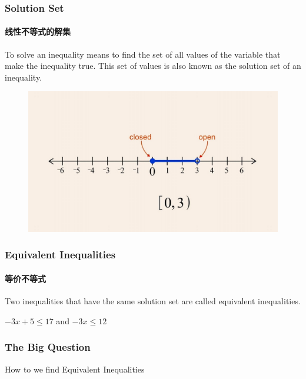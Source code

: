 \documentclass[
	11pt, %
	handout,
]{beamer}
\begin{document}

\begin{frame}
	\frametitle{Solution Set}
	\framesubtitle{线性不等式的解集}
	\begin{definition}
			To solve an inequality means to find the set of all values of the variable that make the inequality true. This set of values is also known as the \alert{solution set} of an inequality.
	\end{definition}
	
	\smallskip %
		
	\begin{figure}
		\includegraphics[width=0.8\linewidth]{Solution_Set.jpeg}
	\end{figure}

\end{frame}

\begin{frame}
	\frametitle{Equivalent Inequalities}
	\framesubtitle{等价不等式}
	\begin{definition}
		Two inequalities that have the \alert{same} solution set are called equivalent inequalities.
	\end{definition}
	
	\smallskip %
	
	\begin{example}
  $-3x +5 \leq 17 $ and $-3x \leq 12$
	\end{example}
	\end{frame}
	

\begin{frame}
	\frametitle{The Big Question }
	{\LARGE How to we find Equivalent Inequalities}

\end{frame}
\end{document}

